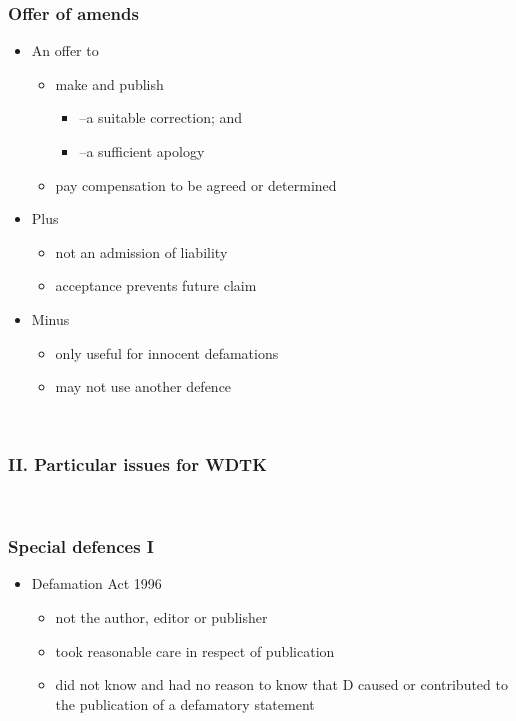 \documentclass[ignorenonframetext,]{beamer}
\begin{document}
\begin{frame}
\frametitle{Offer of amends}

\begin{itemize}
\item  An offer to

  \begin{itemize}
  \item    make and publish

    \begin{itemize}
    \item      {--}a suitable correction; and
    \item      {--}a sufficient apology
    \end{itemize}
  \item    {pay }{compensation to be agreed or determined}
  \end{itemize}
\item  {Plus}

  \begin{itemize}
  \item    {not an admission of liability}
  \item    {acceptance prevents future claim}
  \end{itemize}
\item  {Minus}

  \begin{itemize}
  \item    {only useful for innocent defamations}
  \item    {may not use another defence}
  \end{itemize}
\end{itemize}

~


\end{frame}

\begin{frame}
\frametitle{II. Particular issues for WDTK}

~


\end{frame}

\begin{frame}
\frametitle{Special defences I}

\begin{itemize}
\item  Defamation Act 1996

  \begin{itemize}
  \item    not the author, editor or publisher
  \item    took reasonable care in respect of publication
  \item    did not know and had no reason to know that D caused or
    contributed to the publication of a defamatory statement
  \end{itemize}
\end{itemize}

~


\end{frame}
\end{document}
